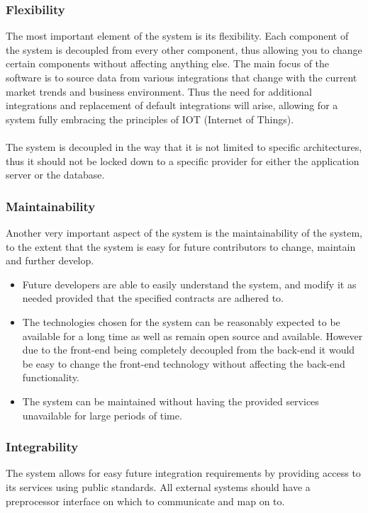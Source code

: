 \documentclass[11pt,a4paper]{article}
\begin{document}
\subsubsection{Flexibility}
The most important element of the system is its flexibility. Each component of the system is decoupled from every other component, thus allowing you to change certain components without affecting anything else. The main focus of the software is to source data from various integrations that change with the current market trends and business environment. Thus the need for additional integrations and replacement of default integrations will arise, allowing for a system fully embracing the principles of IOT (Internet of Things).\\ \\
The system is decoupled in the way that it is not limited to specific architectures, thus it should not be locked down to a specific provider for either the application server or the database.

\subsubsection{Maintainability}
Another very important aspect of the system is the maintainability of the system, to the extent that the system is easy for future contributors to change, maintain and further develop.
\begin{itemize}
	\item Future developers are able to easily understand the system, and modify it as needed provided that the specified contracts are adhered to.
	\item The technologies chosen for the system can be reasonably expected to be available for a long time as well as remain open source and available. However due to the front-end being completely decoupled from the back-end it would be easy to change the front-end technology without affecting the back-end functionality.
	\item The system can be maintained without having the provided services unavailable for large periods of time.
\end{itemize}

\subsubsection{Integrability}
The system allows for easy future integration requirements by providing access to its services using public standards. All external systems should have a preprocessor interface on which to communicate and map on to.
\end{document}
